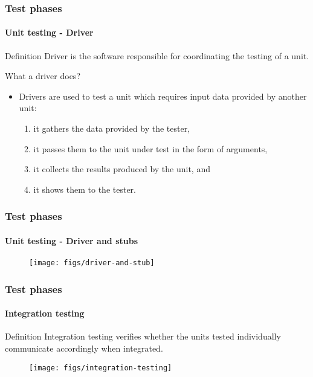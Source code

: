\begin{frame}
\frametitle{Test phases}
\framesubtitle{Unit testing - Driver}
\label{concept:driver}
\label{concept:test-driver}

\begin{block:concept}{Definition}
Driver is the software responsible for coordinating the testing of a unit.
\end{block:concept}

\begin{block:fact}{What a driver does?}
\begin{itemize}
	\item Drivers are used to test a unit which requires input data provided
	by another unit:
	\begin{enumerate}
		\item it gathers the data provided by the tester,
		\item it passes them to the unit under test in the form of arguments,
		\item it collects the results produced by the unit, and
		\item it shows them to the tester.
	\end{enumerate}
\end{itemize}
\end{block:fact}
\end{frame}


\begin{frame}[c]
\frametitle{Test phases}
\framesubtitle{Unit testing - Driver and stubs}

\begin{figure}
	\centering
	\texttt{[image: figs/driver-and-stub]}
\end{figure}
\end{frame}



\begin{frame}
\label{concept:integration-testing}
\frametitle{Test phases}
\framesubtitle{Integration testing}

\begin{block:concept}{Definition}
Integration testing verifies whether the units tested individually communicate
accordingly when integrated.
\end{block:concept}

\begin{figure}
    \centering
    \texttt{[image: figs/integration-testing]}
\end{figure}

\hfill
{}
\end{frame}



